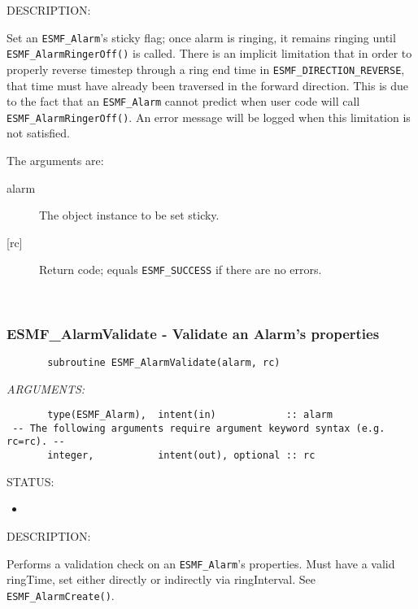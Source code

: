 {\sf DESCRIPTION:\\ }


       Set an {\tt ESMF\_Alarm}'s sticky flag; once alarm is ringing,
       it remains ringing until {\tt ESMF\_AlarmRingerOff()} is called.
       There is an implicit limitation that in order to properly reverse
       timestep through a ring end time in {\tt ESMF\_DIRECTION\_REVERSE}, that
       time must have already been traversed in the forward direction.
       This is due to the fact that an {\tt ESMF\_Alarm} cannot predict when
       user code will call {\tt ESMF\_AlarmRingerOff()}.  An error message
       will be logged when this limitation is not satisfied.
  
       The arguments are:
       \begin{description}
       \item[alarm]
            The object instance to be set sticky.
       \item[{[rc]}]
            Return code; equals {\tt ESMF\_SUCCESS} if there are no errors.
       \end{description}
   
 
\mbox{}\hrulefill\ 
 
\subsubsection [ESMF\_AlarmValidate] {ESMF\_AlarmValidate - Validate an Alarm's properties}


 
\begin{verbatim}       subroutine ESMF_AlarmValidate(alarm, rc)
 \end{verbatim}{\em ARGUMENTS:}
\begin{verbatim}       type(ESMF_Alarm),  intent(in)            :: alarm
 -- The following arguments require argument keyword syntax (e.g. rc=rc). --
       integer,           intent(out), optional :: rc
 \end{verbatim}
{\sf STATUS:}
   \begin{itemize}
   \item{}
   \end{itemize}
  
{\sf DESCRIPTION:\\ }


       Performs a validation check on an {\tt ESMF\_Alarm}'s properties.
       Must have a valid ringTime, set either directly or indirectly via
       ringInterval.  See {\tt ESMF\_AlarmCreate()}.
  
